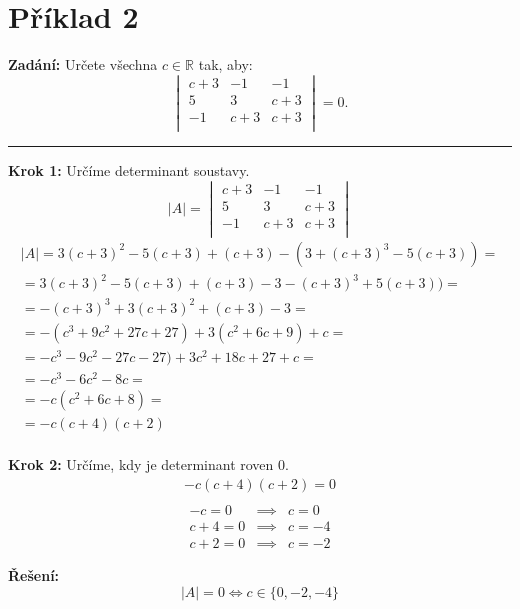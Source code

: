 \section{Příklad 2}


\textbf{Zadání:} Určete všechna $c \in \mathbb{R}$ tak, aby:
\begin{displaymath}
\begin{vmatrix}
c+3 & -1 & -1\\
5 & 3 & c+3\\
-1 & c+3 & c+3\\
\end{vmatrix}
= 0.
\end{displaymath}
\par\noindent\rule{\textwidth}{0.4pt}

\textbf{Krok 1:} Určíme determinant soustavy.
\begin{displaymath}
|A|=
\begin{vmatrix}
c+3 & -1 & -1\\
5 & 3 & c+3\\
-1 & c+3 & c+3\\
\end{vmatrix}
\end{displaymath}
\begin{displaymath}
\begin{matrix}
|A| = 3(c+3)^2-5(c+3)+(c+3)-(3+(c+3)^3-5(c+3)) =\\
= 3(c+3)^2-5(c+3)+(c+3)-3-(c+3)^3+5(c+3)) =\\
= -(c+3)^3+3(c+3)^2+(c+3)-3=\\
= -(c^3+9c^2+27c+27)+3(c^2+6c+9)+c=\\
= -c^3-9c^2-27c-27)+3c^2+18c+27+c=\\
= -c^3-6c^2-8c=\\
=-c(c^2+6c+8)=\\
=-c(c+4)(c+2)\\
\end{matrix}
\end{displaymath}

\textbf{Krok 2:} Určíme, kdy je determinant roven 0.
\begin{displaymath}
\begin{matrix}
-c(c+4)(c+2) = 0\\
\end{matrix}
\end{displaymath}
\begin{displaymath}
\begin{matrix}
-c = 0 & \implies & c = 0 \\
c+4=0 & \implies & c=-4\\
c+2=0 & \implies & c=-2 
\end{matrix}
\end{displaymath}

\textbf{Řešení:}
\begin{displaymath}
|A|=0 \Longleftrightarrow c \in \{0, -2, -4\}
\end{displaymath}

